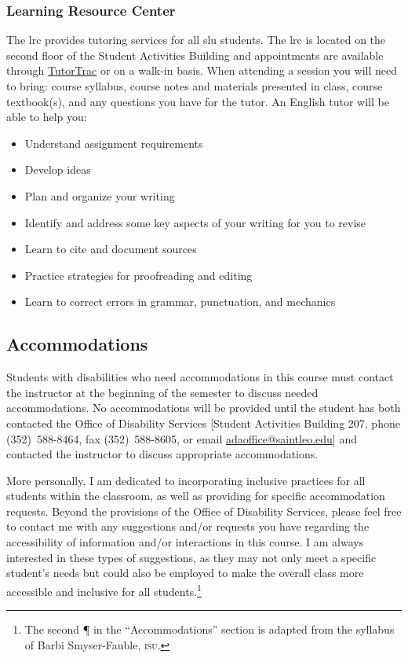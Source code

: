 \documentclass[12pt,oneside]{amsart}	%
\begin{document}
\subsubsection{Learning Resource Center} %
\label{ssub:learning_resource_center}
The \ac{lrc} provides tutoring services for all \ac{slu} students.  The \ac{lrc} is located on the second floor of the Student Activities Building and appointments are available through \href{http://tutoring.saintleo.edu/TracWeb40/Default.html}{TutorTrac} or on a walk-in basis. When attending a session you will need to bring: course syllabus, course notes and materials presented in class, course textbook(s), and any questions you have for the tutor.  An English tutor will be able to help you:

\begin{itemize}
	\item Understand assignment requirements
	\item Develop ideas
	\item Plan and organize your writing
	\item Identify and address some key aspects of your writing for you to revise
	\item Learn to cite and document sources
	\item Practice strategies for proofreading and editing
	\item Learn to correct errors in grammar, punctuation, and mechanics
\end{itemize}


\subsection{Accommodations} %
\label{sub:accommodations}
Students with disabilities who need accommodations in this course must contact the instructor at the beginning of the semester to discuss needed accommodations. No accommodations will be provided until the student has both contacted the Office of Disability Services [Student Activities Building 207, phone \mbox{(352)~588-8464}, fax \mbox{(352)~588-8605}, or email \href{mailto:adaoffice@saintleo.edu}{adaoffice@saintleo.edu}] and contacted the instructor to discuss appropriate accommodations.

More personally, I am dedicated to incorporating inclusive practices for all students within the classroom, as well as providing for specific accommodation requests. Beyond the provisions of the Office of Disability Services, please feel free to contact me with any suggestions and/or requests you have regarding the accessibility of information and/or interactions in this course. I am always interested in these types of suggestions, as they may not only meet a specific student's needs but could also be employed to make the overall class more accessible and inclusive for all students.\footnote{The second ¶ in the ``Accommodations'' section is adapted from the syllabus of Barbi Smyser-Fauble, \textsc{isu}.}
\end{document}
